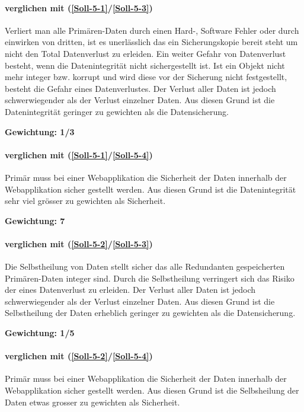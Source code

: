 \paragraph*{ verglichen mit  (\ref{Soll-5-1}/\ref{Soll-5-3})}
Verliert man alle Primären-Daten durch einen Hard-, Software Fehler oder durch einwirken von dritten, ist es unerlässlich das ein Sicherungskopie bereit steht um nicht den Total Datenverlust zu erleiden.
Ein weiter Gefahr von Datenverlust besteht, wenn die Datenintegrität nicht sichergestellt ist. Ist ein Objekt nicht mehr integer bzw. korrupt und wird diese vor der Sicherung nicht festgestellt, besteht die Gefahr eines Datenverlustes.
Der Verlust aller Daten ist jedoch schwerwiegender als der Verlust einzelner Daten.
Aus diesen Grund ist die Datenintegrität geringer zu gewichten als die Datensicherung.

\textbf{Gewichtung: 1/3}

\paragraph*{ verglichen mit  (\ref{Soll-5-1}/\ref{Soll-5-4})}
Primär muss bei einer Webapplikation die Sicherheit der Daten innerhalb der Webapplikation sicher gestellt werden. Aus diesen Grund ist die Datenintegrität sehr viel grösser zu gewichten als Sicherheit.

\textbf{Gewichtung: 7}

\paragraph*{ verglichen mit  (\ref{Soll-5-2}/\ref{Soll-5-3})}
Die Selbstheilung von Daten stellt sicher das alle Redundanten gespeicherten Primären-Daten integer sind. Durch die Selbstheilung verringert sich das Risiko der eines Datenverlust zu erleiden. 
Der Verlust aller Daten ist jedoch schwerwiegender als der Verlust einzelner Daten.
Aus diesen Grund ist die Selbstheilung der Daten erheblich geringer zu gewichten als die Datensicherung.

\textbf{Gewichtung: 1/5}

\paragraph*{ verglichen mit  (\ref{Soll-5-2}/\ref{Soll-5-4})}
Primär muss bei einer Webapplikation die Sicherheit der Daten innerhalb der Webapplikation sicher gestellt werden. Aus diesen Grund ist die Selbsheilung der Daten etwas grosser zu gewichten als Sicherheit.

